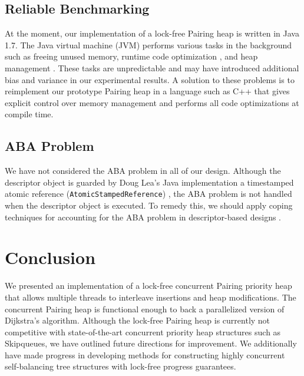 \documentclass{acm_proc_article-sp}
\begin{document}
\subsection{Reliable Benchmarking}
At the moment, our implementation of a lock-free Pairing heap is
written in Java 1.7. The Java virtual machine (JVM) performs
various tasks in the background \cite{peierls05} such as freeing unused memory, runtime code optimization \cite{ogata10},
and heap management \cite{altman10}. These tasks are unpredictable and may have
introduced additional bias and variance in our experimental results.
A solution to these problems is to reimplement our prototype Pairing heap in a
language such as C++ that gives explicit control over memory management and
performs all code optimizations at compile time.

\subsection{ABA Problem}
We have not considered the ABA problem in all of our design. Although the descriptor
object is guarded by Doug Lea's Java implementation a timestamped atomic reference (\texttt{AtomicStampedReference})
\cite{herlihy08}, the ABA problem is not handled when the descriptor object is executed.
To remedy this, we should apply coping techniques for accounting for the ABA problem
in descriptor-based designs \cite{dechev11} \cite{dechev10}.

\section{Conclusion}
We presented an implementation of a lock-free concurrent Pairing priority heap that allows
multiple threads to interleave insertions and heap modifications. The concurrent Pairing
heap is functional enough to back a parallelized version of Dijkstra's algorithm.
Although the lock-free Pairing heap is currently not competitive with state-of-the-art
concurrent priority heap structures such as Skipqueues, we have outlined future
directions for improvement. We additionally have made progress in developing
methods for constructing highly concurrent self-balancing tree structures with
lock-free progress guarantees.

\end{document}
